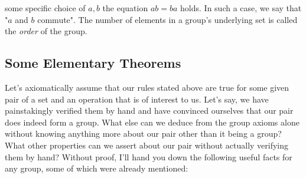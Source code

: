 some specific choice of $a,b$ the equation $a b = b a$ holds. In such a case, we say that "$a$ and $b$ commute". The number of elements in a group's underlying set is called the \emph{order} of the group.






\subsection{Some Elementary Theorems}
Let's axiomatically assume that our rules stated above are true for some given pair of a set and an operation that is of interest to us. Let's say, we have painstakingly verified them by hand and have convinced ourselves that our pair does indeed form a group. What else can we deduce from the group axioms alone without knowing anything more about our pair other than it being a group? What other properties can we assert about our pair without actually verifying them by hand? Without proof, I'll hand you down the following useful facts for any group, some of which were already mentioned: 
